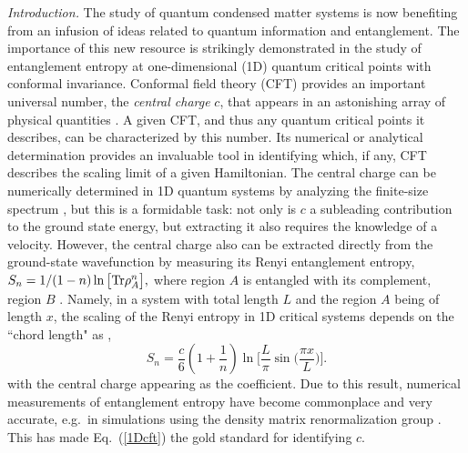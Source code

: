 \documentclass[prl,aps,twocolumn,floatfix,amsmath,amssymb,superscriptaddress,tightenlines]{revtex4}
\begin{document}
{\it Introduction.} 
The study of quantum condensed matter systems
 is now benefiting from an infusion of ideas related to quantum information and entanglement. The importance of this new resource is strikingly 
demonstrated in the study of entanglement entropy at one-dimensional (1D) quantum critical points with conformal invariance. Conformal field theory (CFT) provides an important
universal number, the {\it central charge} $c$, that appears in an astonishing array of physical
quantities \cite{Cardyubiquitous}. A given CFT, and
thus any quantum critical points it describes, can be
characterized by this number.
Its numerical or analytical determination provides an invaluable tool in identifying which, if any, CFT describes the scaling limit of a given Hamiltonian. 
The central charge can be numerically determined in 1D quantum systems by analyzing the finite-size spectrum \cite{BCN,Affleck}, but this is a formidable task: not only is $c$ a subleading contribution to the ground state energy, but extracting it also requires the knowledge of a velocity.
%
However,  the central charge also can be extracted 
directly from the ground-state wavefunction by measuring its Renyi
entanglement entropy, $ S_n = 1/(1-n) \ln \big[ {\rm Tr} \rho_A^n
\big], $ where region $A$ is entangled with its complement, region
$B$ \cite{Holzhey, VidalC}. Namely, in a system with total length $L$ and the region $A$ being of length $x$, the scaling of the Renyi entropy in 1D critical systems depends on the ``chord length" as \cite{Holzhey,Korepin,Cardy},
%
\begin{equation}
S_n = \frac{c}{6}\left({1+ \frac{1}{n} }\right) \ln\Big[ \frac{L}{\pi} \sin\big( \frac{\pi x}{L} \big) \Big]. \label{1Dcft}
\end{equation}
with the central charge appearing as the coefficient.
Due to this result, numerical measurements of entanglement entropy have become commonplace and 
very accurate, e.g.\ in simulations using the density matrix renormalization group \cite{White92,Scholl05}. This has made
Eq.~(\ref{1Dcft}) the gold standard for identifying $c$.
\end{document}
